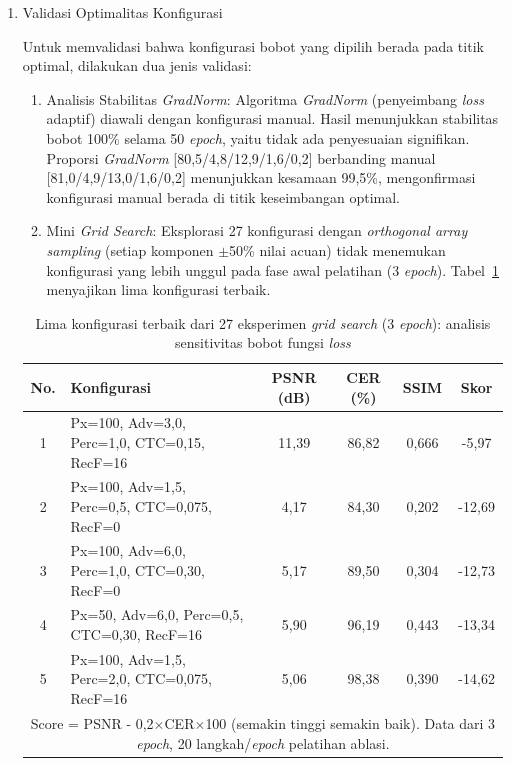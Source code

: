 \begin{enumerate}[leftmargin=1.5em, labelsep=0.5em, itemindent=0pt, label=\arabic*., topsep=0pt, partopsep=0pt]
    \item Validasi Optimalitas Konfigurasi
    
    Untuk memvalidasi bahwa konfigurasi bobot yang dipilih berada pada titik optimal, dilakukan dua jenis validasi:

    \begin{enumerate}[leftmargin=1.5em, labelsep=0.5em, itemindent=0pt, noitemsep, topsep=0pt, label=\alph*)]
        \item Analisis Stabilitas \textit{GradNorm}: Algoritma \textit{GradNorm} (penyeimbang \textit{loss} adaptif) diawali dengan konfigurasi manual. Hasil menunjukkan stabilitas bobot 100\% selama 50 \textit{epoch}, yaitu tidak ada penyesuaian signifikan. Proporsi \textit{GradNorm} [80,5/4,8/12,9/1,6/0,2] berbanding manual [81,0/4,9/13,0/1,6/0,2] menunjukkan kesamaan 99,5\%, mengonfirmasi konfigurasi manual berada di titik keseimbangan optimal.
        
        \item Mini \textit{Grid Search}: Eksplorasi 27 konfigurasi dengan \textit{orthogonal array sampling} (setiap komponen $\pm$50\% nilai acuan) tidak menemukan konfigurasi yang lebih unggul pada fase awal pelatihan (3 \textit{epoch}). Tabel~\ref{tab:grid-search-top5} menyajikan lima konfigurasi terbaik.
    \end{enumerate}

    \begin{table}[!htbp]
        \caption[Lima konfigurasi terbaik \textit{grid search}]{Lima konfigurasi terbaik dari 27 eksperimen \textit{grid search} (3 \textit{epoch}): analisis sensitivitas bobot fungsi \textit{loss}}
        \label{tab:grid-search-top5}
        \small
        \begin{tabular}{|c|p{4.5cm}|c|c|c|c|}
            \hline
            \textbf{No.} & \textbf{Konfigurasi} & \textbf{PSNR (dB)} & \textbf{CER (\%)} & \textbf{SSIM} & \textbf{Skor} \\
            \hline
            1 & Px=100, Adv=3,0, Perc=1,0, CTC=0,15, RecF=16 & 11,39 & 86,82 & 0,666 & -5,97 \\
            2 & Px=100, Adv=1,5, Perc=0,5, CTC=0,075, RecF=0 & 4,17 & 84,30 & 0,202 & -12,69 \\
            3 & Px=100, Adv=6,0, Perc=1,0, CTC=0,30, RecF=0 & 5,17 & 89,50 & 0,304 & -12,73 \\
            4 & Px=50, Adv=6,0, Perc=0,5, CTC=0,30, RecF=16 & 5,90 & 96,19 & 0,443 & -13,34 \\
            5 & Px=100, Adv=1,5, Perc=2,0, CTC=0,075, RecF=16 & 5,06 & 98,38 & 0,390 & -14,62 \\
            \hline
            \multicolumn{6}{|p{13cm}|}{\footnotesize Score = PSNR - 0,2$\times$CER$\times$100 (semakin tinggi semakin baik). Data dari 3 \textit{epoch}, 20 langkah/\textit{epoch} pelatihan ablasi.} \\
            \hline
        \end{tabular}
    \end{table}


\end{enumerate}
